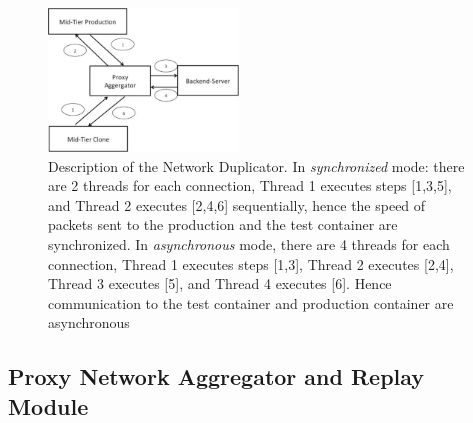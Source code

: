 \begin{figure}[t]
  \begin{center}
    \includegraphics[width=0.45\textwidth]{figs/aggregator.eps}
    \caption{Description of the Network Duplicator. In \textit{synchronized} mode: there are 2 threads for each connection, Thread 1 executes steps [1,3,5], and Thread 2 executes [2,4,6] sequentially, hence the speed of packets sent to the production and the test container are synchronized. In \textit{asynchronous} mode, there are 4 threads for each connection, Thread 1 executes steps [1,3], Thread 2 executes [2,4], Thread 3 executes [5], and Thread 4 executes [6]. Hence communication to the test container and production container are asynchronous}
    \label{fig:duplicator}
  \end{center}
\end{figure}

\subsection{Proxy Network Aggregator and Replay Module}
\label{sec:proxyAggregator}

